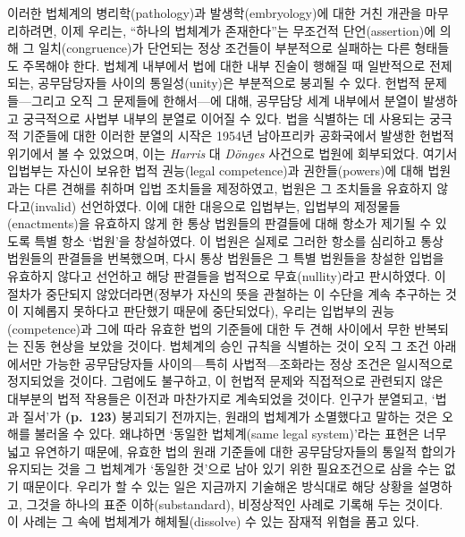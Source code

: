 이러한 법체계의 병리학(pathology)과 발생학(embryology)에 대한 거친
개관을 마무리하려면, 이제 우리는, “하나의 법체계가 존재한다”는
무조건적 단언(assertion)에 의해 그 일치(congruence)가 단언되는 정상
조건들이 부분적으로 실패하는 다른 형태들도 주목해야 한다. 법체계
내부에서 법에 대한 내부 진술이 행해질 때 일반적으로 전제되는,
공무담당자들 사이의 통일성(unity)은 부분적으로 붕괴될 수 있다. 헌법적
문제들---그리고 오직 그 문제들에 한해서---에 대해, 공무담당 세계
내부에서 분열이 발생하고 궁극적으로 사법부 내부의 분열로 이어질 수 있다.
법을 식별하는 데 사용되는 궁극적 기준들에 대한 이러한 분열의 시작은
1954년 남아프리카 공화국에서 발생한 헌법적 위기에서 볼 수 있었으며, 이는
\emph{Harris} 대 \emph{Dönges} 사건으로 법원에 회부되었다. 여기서
입법부는 자신이 보유한 법적 권능(legal competence)과 권한들(powers)에
대해 법원과는 다른 견해를 취하며 입법 조치들을 제정하였고, 법원은 그
조치들을 유효하지 않다고(invalid) 선언하였다. 이에 대한 대응으로
입법부는, 입법부의 제정물들(enactments)을 유효하지 않게 한 통상 법원들의
판결들에 대해 항소가 제기될 수 있도록 특별 항소 ‘법원’을 창설하였다. 이
법원은 실제로 그러한 항소를 심리하고 통상 법원들의 판결들을 번복했으며,
다시 통상 법원들은 그 특별 법원들을 창설한 입법을 유효하지 않다고
선언하고 해당 판결들을 법적으로 무효(nullity)라고 판시하였다. 이 절차가
중단되지 않았더라면(정부가 자신의 뜻을 관철하는 이 수단을 계속 추구하는
것이 지혜롭지 못하다고 판단했기 때문에 중단되었다), 우리는 입법부의
권능(competence)과 그에 따라 유효한 법의 기준들에 대한 두 견해 사이에서
무한 반복되는 진동 현상을 보았을 것이다. 법체계의 승인 규칙을 식별하는
것이 오직 그 조건 아래에서만 가능한 공무담당자들 사이의---특히
사법적---조화라는 정상 조건은 일시적으로 정지되었을 것이다. 그럼에도
불구하고, 이 헌법적 문제와 직접적으로 관련되지 않은 대부분의 법적
작용들은 이전과 마찬가지로 계속되었을 것이다. 인구가 분열되고, ‘법과
질서’가 \textbf{(p.~123)} 붕괴되기 전까지는, 원래의 법체계가 소멸했다고
말하는 것은 오해를 불러올 수 있다. 왜냐하면 ‘동일한 법체계(same legal
system)’라는 표현은 너무 넓고 유연하기 때문에, 유효한 법의
 원래 기준들에 대한 공무담당자들의 통일적 합의가
유지되는 것을 그 법체계가 ‘동일한 것’으로 남아 있기 위한 필요조건으로
삼을 수는 없기 때문이다. 우리가 할 수 있는 일은 지금까지 기술해온
방식대로 해당 상황을 설명하고, 그것을 하나의 표준 이하(substandard),
비정상적인 사례로 기록해 두는 것이다. 이 사례는 그 속에 법체계가
해체될(dissolve) 수 있는 잠재적 위협을 품고 있다.

